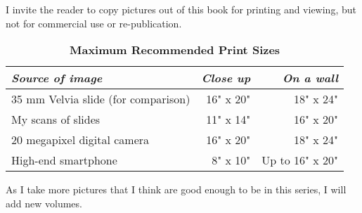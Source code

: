 I invite the reader to copy pictures out of this book for printing and viewing, but not for commercial use or re-publication. 

\begin{table}[h]
\centering
\captionsetup{labelformat=empty}
\caption{\textbf{Maximum Recommended Print Sizes}}
\begin{tabular}{lrr}
\hline
\emph{Source of image}                                  & \emph{Close up} & \emph{On a wall} \\
\hline
35 mm Velvia slide (for comparison) & 16" x 20" & 18" x 24" \\
My scans of slides                            & 11" x 14"  & 16" x 20"  \\
20 megapixel digital camera             & 16" x 20"  & 18" x 24"  \\
High-end smartphone                      & 8" x 10"   & Up to 16" x 20"  \\
\hline
\end{tabular}
\end{table}

As I take more pictures that I think are good enough to be in this series, I will add new volumes.
